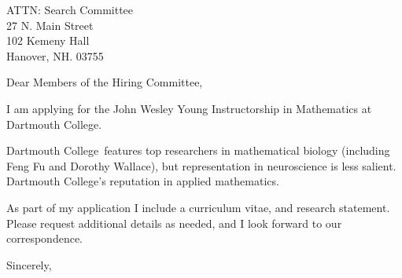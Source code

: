 \documentclass[11pt,a4paper]{letter}
\begin{document}

\def\School{Dartmouth College}

\begin{letter}
{ATTN: Search Committee\\
27 N. Main Street\\
102 Kemeny Hall\\
Hanover, NH. 03755
}


\opening{Dear Members of the Hiring Committee,}

I am applying for the John Wesley Young Instructorship in Mathematics at \School. 



\School~features top researchers in mathematical biology (including Feng Fu and Dorothy Wallace), but representation in neuroscience is less salient. \School's reputation in applied mathematics.



As part of my application I include a curriculum vitae, and research statement. Please request additional details as needed, and I look forward to our correspondence.

\closing{Sincerely,}
\end{letter}
\end{document}
